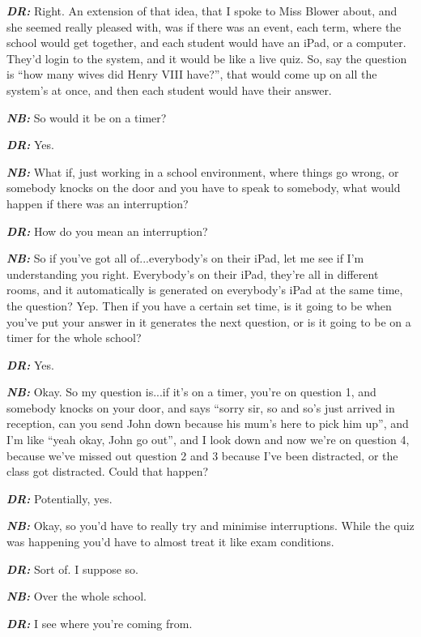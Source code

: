 \textit{\textbf{DR:}} Right. An extension of that idea, that I spoke to Miss Blower about, and she seemed really pleased with, was if there was an event, each term, where the school would get together, and each student would have an iPad, or a computer. They'd login to the system, and it would be like a live quiz. So, say the question is ``how many wives did Henry VIII have?'', that would come up on all the system's at once, and then each student would have their answer.

\textit{\textbf{NB:}} So would it be on a timer?

\textit{\textbf{DR:}} Yes.

\textit{\textbf{NB:}} What if, just working in a school environment, where things go wrong, or somebody knocks on the door and you have to speak to somebody, what would happen if there was an interruption?

\textit{\textbf{DR:}} How do you mean an interruption?

\textit{\textbf{NB:}} So if you've got all of...everybody's on their iPad, let me see if I'm understanding you right. Everybody's on their iPad, they're all in different rooms, and it automatically is generated on everybody's iPad at the same time, the question? Yep. Then if you have a certain set time, is it going to be when you've put your answer in it generates the next question, or is it going to be on a timer for the whole school?

\textit{\textbf{DR:}} Yes.

\textit{\textbf{NB:}} Okay. So my question is...if it's on a timer, you're on question 1, and somebody knocks on your door, and says ``sorry sir, so and so's just arrived in reception, can you send John down because his mum's here to pick him up'', and I'm like ``yeah okay, John go out'', and I look down and now we're on question 4, because we've missed out question 2 and 3 because I've been distracted, or the class got distracted. Could that happen?

\textit{\textbf{DR:}} Potentially, yes.

\textit{\textbf{NB:}} Okay, so you'd have to really try and minimise interruptions. While the quiz was happening you'd have to almost treat it like exam conditions.

\textit{\textbf{DR:}} Sort of. I suppose so.

\textit{\textbf{NB:}} Over the whole school.

\textit{\textbf{DR:}} I see where you're coming from.

